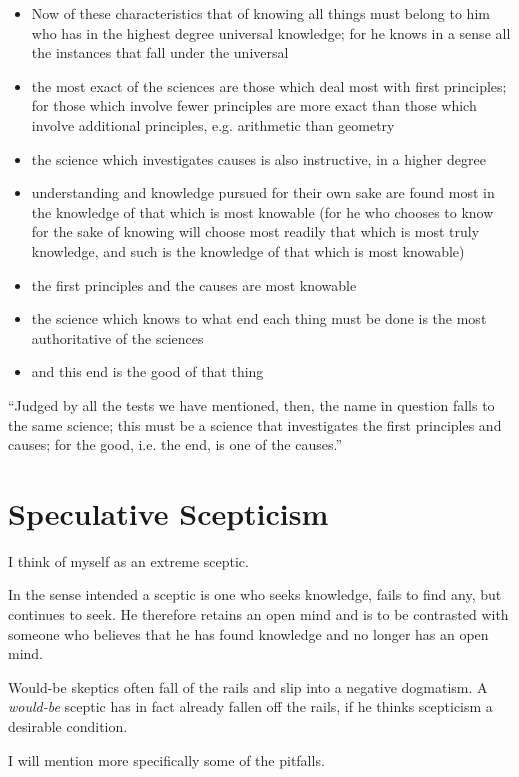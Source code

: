 \documentclass{rbjk}
\begin{document}
\begin{article}
\begin{itemize}
\item Now of these characteristics that of knowing all things must belong to him who has in the highest degree universal knowledge; for he knows in a sense all the instances that fall under the universal
\item the most exact of the sciences are those which deal most with first principles; for those which involve fewer principles are more exact than those which involve additional principles, e.g. arithmetic than geometry
\item the science which investigates causes is also instructive, in a higher degree
\item understanding and knowledge pursued for their own sake are found most in the knowledge of that which is most knowable (for he who chooses to know for the sake of knowing will choose most readily that which is most truly knowledge, and such is the knowledge of that which is most knowable)
\item the first principles and the causes are most knowable
\item the science which knows to what end each thing must be done is the most authoritative of the sciences
\item and this end is the good of that thing
\end{itemize}

``Judged by all the tests we have mentioned, then, the name in question falls to the same science; this must be a science that investigates the first principles and causes; for the good, i.e. the end, is one of the causes.''

\section{Speculative Scepticism}

I think of myself as an extreme sceptic.

In the sense intended a sceptic is one who seeks knowledge, fails to find any, but continues to seek.
He therefore retains an open mind and is to be contrasted with someone who believes that he has found knowledge and no longer has an open mind.

Would-be skeptics often fall of the rails and slip into a negative dogmatism.
A {\it would-be} sceptic has in fact already fallen off the rails, if he thinks scepticism a desirable condition.

I will mention more specifically some of the pitfalls.


\end{article}
\end{document}
